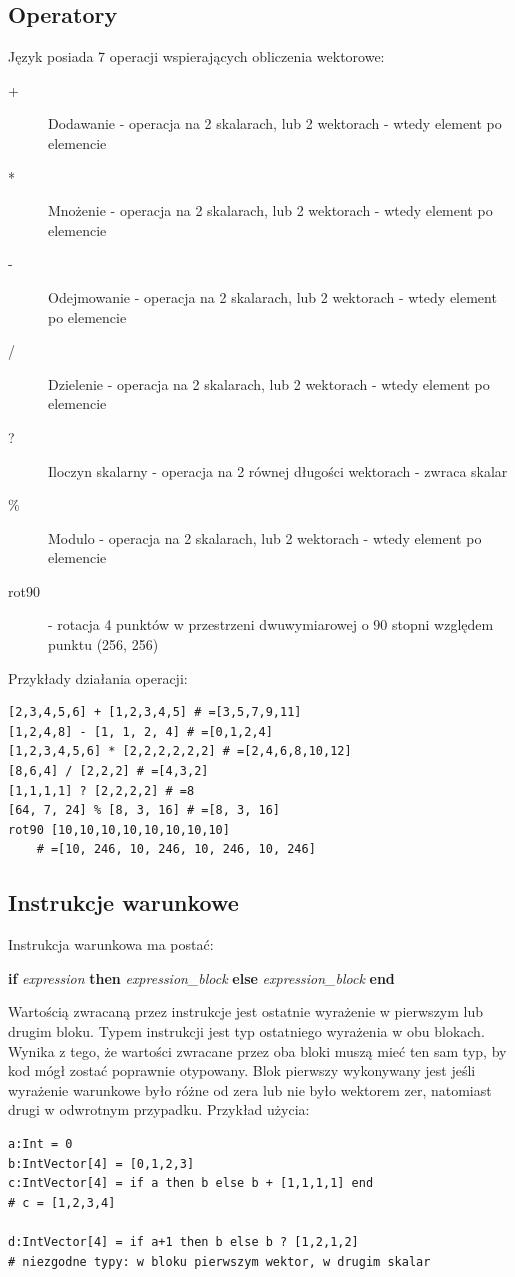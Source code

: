 \subsection{Operatory}
Język posiada 7 operacji wspierających obliczenia wektorowe:
\begin{description}
  \item[+] Dodawanie - operacja na 2 skalarach, lub 2 wektorach - wtedy element po elemencie
  \item[*] Mnożenie - operacja na 2 skalarach, lub 2 wektorach - wtedy element po elemencie
  \item[-] Odejmowanie - operacja na 2 skalarach, lub 2 wektorach - wtedy element po elemencie
  \item[/] Dzielenie - operacja na 2 skalarach, lub 2 wektorach - wtedy element po elemencie
  \item[?] Iloczyn skalarny - operacja na 2 równej długości wektorach - zwraca skalar
  \item[\%] Modulo - operacja na 2 skalarach, lub 2 wektorach - wtedy element po elemencie
  \item[rot90] - rotacja 4 punktów w przestrzeni dwuwymiarowej o 90 stopni względem punktu (256, 256)
\end{description}

Przykłady działania operacji:
\begin{lstlisting}[frame=single]
[2,3,4,5,6] + [1,2,3,4,5] # =[3,5,7,9,11]
[1,2,4,8] - [1, 1, 2, 4] # =[0,1,2,4]
[1,2,3,4,5,6] * [2,2,2,2,2,2] # =[2,4,6,8,10,12]
[8,6,4] / [2,2,2] # =[4,3,2]
[1,1,1,1] ? [2,2,2,2] # =8
[64, 7, 24] % [8, 3, 16] # =[8, 3, 16]
rot90 [10,10,10,10,10,10,10,10] 
    # =[10, 246, 10, 246, 10, 246, 10, 246]
\end{lstlisting}

\subsection{Instrukcje warunkowe}
Instrukcja warunkowa ma postać:
\begin{center}
\textbf{if} \textit{expression} \textbf{then} \textit{expression\_block} \textbf{else} \textit{expression\_block} \textbf{end}
\end{center}
Wartością zwracaną przez instrukcje jest ostatnie wyrażenie w pierwszym lub drugim bloku. Typem instrukcji jest typ ostatniego wyrażenia w obu blokach. Wynika z tego, że wartości zwracane przez oba bloki muszą mieć ten sam typ, by kod mógł zostać poprawnie otypowany. Blok pierwszy wykonywany jest jeśli wyrażenie warunkowe było różne od zera lub nie było wektorem zer, natomiast drugi w odwrotnym przypadku.
Przykład użycia:
\begin{lstlisting}[frame=single]
a:Int = 0
b:IntVector[4] = [0,1,2,3]
c:IntVector[4] = if a then b else b + [1,1,1,1] end
# c = [1,2,3,4]

d:IntVector[4] = if a+1 then b else b ? [1,2,1,2]
# niezgodne typy: w bloku pierwszym wektor, w drugim skalar 
\end{lstlisting}

